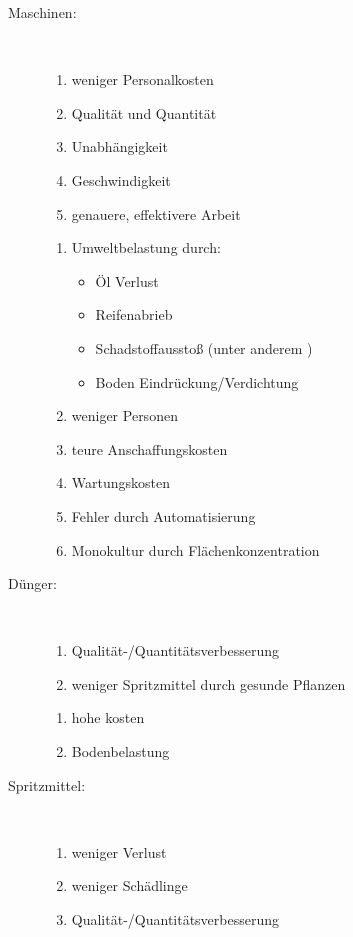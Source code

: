 \begin{description}
	\item[Maschinen:]~
	\begin{enumerate}[{Pro }1:]
		\item weniger Personalkosten
		\item Qualität und Quantität
		\item Unabhängigkeit
		\item Geschwindigkeit
		\item genauere, effektivere Arbeit
	\end{enumerate}
	\begin{enumerate}[{Kontra }1:]
		\item Umweltbelastung durch:
		\begin{itemize}
			\item Öl Verlust
			\item Reifenabrieb
			\item Schadstoffausstoß (unter anderem )
			\item Boden Eindrückung/Verdichtung
		\end{itemize}
		\item weniger Personen
		\item teure Anschaffungskosten
		\item Wartungskosten
		\item Fehler durch Automatisierung
		\item Monokultur durch Flächenkonzentration
	\end{enumerate}
	\item[Dünger:]~
	\begin{enumerate}[{Pro }1:]
		\item Qualität-/Quantitätsverbesserung
		\item weniger Spritzmittel durch gesunde Pflanzen
	\end{enumerate}
	\begin{enumerate}[{Kontra }1:]
		\item hohe kosten
		\item Bodenbelastung
	\end{enumerate}
	\item[Spritzmittel:]~
	\begin{enumerate}[{Pro }1:]
		\item weniger Verlust
		\item weniger Schädlinge
		\item Qualität-/Quantitätsverbesserung
	\end{enumerate}

\end{description}
